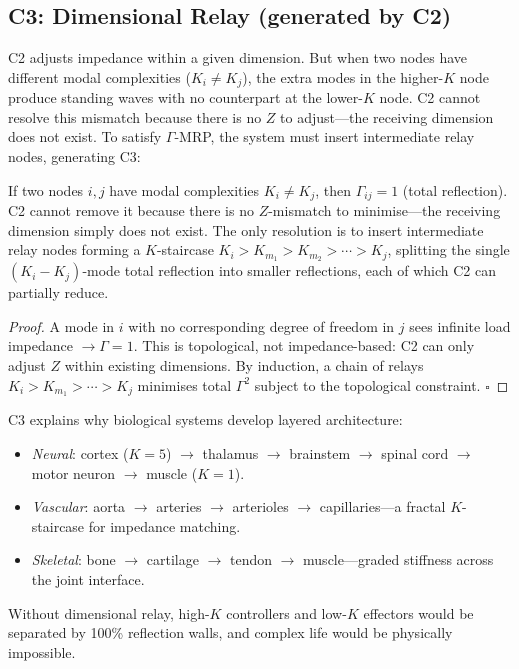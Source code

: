 \documentclass[aps,pre,twocolumn,superscriptaddress,floatfix]{revtex4-2}
\begin{document}
\subsection{C3: Dimensional Relay (generated by C2)}
\label{sec:c3}

C2 adjusts impedance within a given dimension.
But when two nodes have different modal complexities
($K_i \neq K_j$), the extra modes in the
higher-$K$ node produce standing waves with no
counterpart at the lower-$K$ node.
C2 cannot resolve this mismatch because there is no
$Z$ to adjust---the receiving dimension does not exist.
To satisfy $\Gamma$-MRP, the system must insert
intermediate relay nodes, generating C3:

\begin{theorem}[C3 \textnormal{(E0)}]
\label{thm:c3}
If two nodes $i,j$ have modal complexities
$K_i \neq K_j$, then
$\Gamma_{ij} = 1$ (total reflection).
C2 cannot remove it because there is no
$Z$-mismatch to minimise---the receiving dimension
simply does not exist.
The only resolution is to insert intermediate
relay nodes forming a $K$-staircase
$K_i > K_{m_1} > K_{m_2} > \cdots > K_j$,
splitting the single $(K_i - K_j)$-mode total
reflection into smaller reflections, each of which
C2 can partially reduce.
\end{theorem}

\begin{proof}
A mode in $i$ with no corresponding degree of
freedom in $j$ sees infinite load impedance
$\to \Gamma = 1$.
This is topological, not impedance-based:
C2 can only adjust $Z$ within existing dimensions.
By induction, a chain of relays
$K_i > K_{m_1} > \cdots > K_j$
minimises total $\Gamma^2$ subject to the
topological constraint. $\square$
\end{proof}

\noindent
C3 explains why biological systems develop layered
architecture:
\begin{itemize}
  \item \emph{Neural}: cortex ($K\!=\!5$) $\to$
    thalamus $\to$ brainstem $\to$ spinal cord
    $\to$ motor neuron $\to$ muscle ($K\!=\!1$).
  \item \emph{Vascular}: aorta $\to$ arteries $\to$
    arterioles $\to$ capillaries---a fractal
    $K$-staircase for impedance matching.
  \item \emph{Skeletal}: bone $\to$ cartilage $\to$
    tendon $\to$ muscle---graded stiffness
    across the joint interface.
\end{itemize}
Without dimensional relay, high-$K$ controllers
and low-$K$ effectors would be separated by
100\% reflection walls, and complex life would
be physically impossible.
\end{document}

